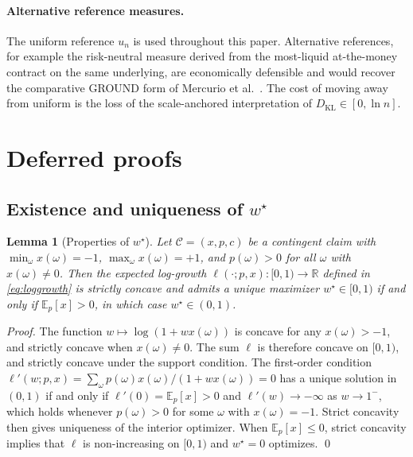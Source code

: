 \documentclass[11pt]{article}
\newtheorem{lemma}[theorem]{Lemma}
\theoremstyle{definition}
\theoremstyle{remark}
\newcommand{\E}{\mathbb{E}}
\newcommand{\R}{\mathbb{R}}
\newcommand{\C}{\mathcal{C}}
\newcommand{\KL}{D_{\mathrm{KL}}}
\begin{document}
\paragraph{Alternative reference measures.}
The uniform reference $u_n$ is used throughout this paper.
Alternative references, for example the risk-neutral measure
derived from the most-liquid at-the-money contract on the same
underlying, are economically defensible and would recover the
comparative GROUND form of Mercurio et al.\ \cite{mercurio2020binary}. The cost of
moving away from uniform is the loss of the scale-anchored
interpretation of $\KL \in [0, \ln n]$.


\appendix

\section{Deferred proofs}\label{app:proofs}

\subsection{Existence and uniqueness of \texorpdfstring{$w^\star$}{w-star}}

\begin{lemma}[Properties of $w^\star$]\label{lem:wstar}
Let $\C = (x, p, c)$ be a contingent claim with $\min_\omega
x(\omega) = -1$, $\max_\omega x(\omega) = +1$, and $p(\omega) > 0$
for all $\omega$ with $x(\omega) \neq 0$. Then the expected
log-growth $\ell(\cdot; p, x): [0, 1) \to \R$ defined in
\eqref{eq:loggrowth} is strictly concave and admits a unique
maximizer $w^\star \in [0, 1)$ if and only if $\E_p[x] > 0$, in
which case $w^\star \in (0, 1)$.
\end{lemma}

\begin{proof}
The function $w \mapsto \log(1 + w x(\omega))$ is concave for any
$x(\omega) > -1$, and strictly concave when $x(\omega) \neq 0$. The
sum $\ell$ is therefore concave on $[0, 1)$, and strictly concave
under the support condition. The first-order condition
$\ell'(w; p, x) = \sum_\omega p(\omega) x(\omega) / (1 + w
x(\omega)) = 0$ has a unique solution in $(0, 1)$ if and only if
$\ell'(0) = \E_p[x] > 0$ and $\ell'(w) \to -\infty$ as $w \to 1^-$,
which holds whenever $p(\omega) > 0$ for some $\omega$ with
$x(\omega) = -1$. Strict concavity then gives uniqueness of the
interior optimizer. When $\E_p[x] \le 0$, strict concavity implies
that $\ell$ is non-increasing on $[0, 1)$ and $w^\star = 0$
optimizes. \qed
\end{proof}
\end{document}
